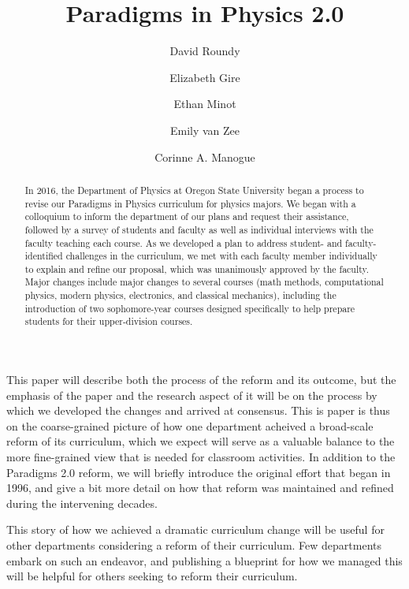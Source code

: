 \documentclass[aps,prstper,reprint]{revtex4-1}
\begin{document}
\title{Paradigms in Physics 2.0}
\author{David Roundy}
\author{Elizabeth Gire}
\author{Ethan Minot}
\author{Emily van Zee}
\author{Corinne A. Manogue}


\begin{abstract}
In 2016, the Department of Physics at Oregon State University began a
process to revise our Paradigms in Physics curriculum for physics
majors.  We began with a colloquium to inform the department of our
plans and request their assistance, followed by a
survey of students and faculty as well as individual interviews with
the faculty teaching each course.  As we developed a plan to
address student- and faculty-identified challenges in the curriculum,
we met with each faculty member individually to explain and refine our
proposal, which was unanimously approved by the faculty.  Major
changes include major changes to several courses (math
methods, computational physics, modern physics, electronics, and
classical mechanics), including the introduction of two sophomore-year
courses designed specifically to help prepare students for their
upper-division courses.
\end{abstract}

\maketitle

This paper will describe both the process of the reform and its
outcome, but the emphasis of the paper and the research aspect of it
will be on the process by which we developed the changes and arrived
at consensus.  This is paper is thus on the coarse-grained picture of
how one department acheived a broad-scale reform of its curriculum,
which we expect will serve as a valuable balance to the more
fine-grained view that is needed for classroom activities.  In
addition to the Paradigms 2.0 reform, we will briefly introduce the
original effort that began in 1996, and give a bit more detail on how
that reform was maintained and refined during the intervening decades.

This story of how we achieved a dramatic curriculum change will be
useful for other departments considering a reform of their curriculum.
Few departments embark on such an endeavor, and publishing a blueprint
for how we managed this will be helpful for others seeking to reform
their curriculum.
\end{document}
